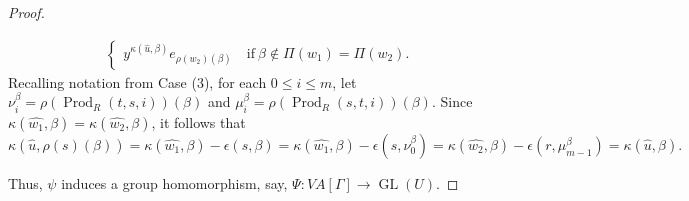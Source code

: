 \documentclass[12pt]{amsart}
\numberwithin{equation}{section}
\newcommand{\GL}{\operatorname{GL}}
\begin{document}
\begin{proof}
\begin{enumerate}
\begin{eqnarray*}
\begin{cases}
y^{\kappa(\widehat{u}, \beta)}  e_{\rho(w_2)(\beta)}& ~\text{if}~ \beta \not\in \Pi(w_1)=\Pi(w_2).
\end{cases}
\end{eqnarray*}
Recalling notation from Case (3), for each $0\leq i \leq m$, let $\nu^\beta_i=\rho(\operatorname{Prod}_R\left(t,s, i\right))(\beta)$ and 
$\mu^\beta_i=\rho(\operatorname{Prod}_R\left(s,t, i\right))(\beta)$. Since $\kappa(\widehat{w_1}, \beta)= \kappa(\widehat{w_2}, \beta)$, it follows that
$$ \kappa(\widehat{u}, \rho(s)(\beta))= \kappa(\widehat{w_1}, \beta)-\epsilon(s,\beta)= \kappa(\widehat{w_1}, \beta)-\epsilon(s,\nu^\beta_0)=
\kappa(\widehat{w_2}, \beta)-\epsilon(r,\mu^\beta_{m-1})= \kappa(\widehat{u}, \beta).
$$
\end{enumerate}
Thus, $\psi$ induces a group homomorphism, say, $\Psi:VA[\Gamma]\to \GL(U)$.
\medskip


\end{proof}
\end{document}
